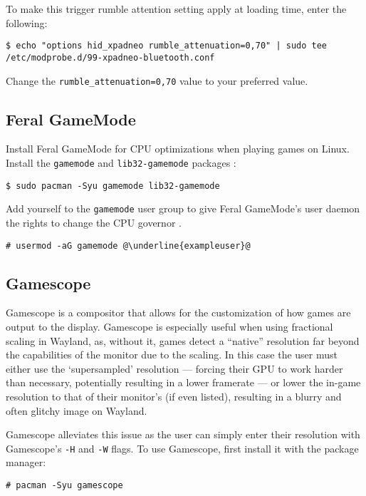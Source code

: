 \documentclass[a4paper]{article}
\begin{document}
To make this trigger rumble attention setting apply at loading time, enter the following: \cite{xpadneo-troubleshooting}

\begin{lstlisting}
$ echo "options hid_xpadneo rumble_attenuation=0,70" | sudo tee /etc/modprobe.d/99-xpadneo-bluetooth.conf
\end{lstlisting}
Change the \lstinline|rumble_attenuation=0,70| value to your preferred value.

\subsection{Feral GameMode}

Install Feral GameMode for CPU optimizations when playing games on Linux.
Install the \lstinline|gamemode| and \lstinline|lib32-gamemode| packages \cite{arch-wiki-gamemode}:

\begin{lstlisting}
$ sudo pacman -Syu gamemode lib32-gamemode
\end{lstlisting}

Add yourself to the \lstinline|gamemode| user group to give Feral GameMode's user daemon the rights to change the CPU governor \cite{arch-wiki-gamemode}.
\begin{lstlisting}[escapechar=@]
# usermod -aG gamemode @\underline{exampleuser}@
\end{lstlisting}

\subsection{Gamescope}

Gamescope is a compositor that allows for the customization of how games are output to the display.
Gamescope is especially useful when using fractional scaling in Wayland, as, without it, games detect a ``native'' resolution far beyond the capabilities of the monitor due to the scaling.
In this case the user must either use the `supersampled' resolution --- forcing their GPU to work harder than necessary, potentially resulting in a lower framerate --- or lower the in-game resolution to that of their monitor's (if even listed), resulting in a blurry and often glitchy image on Wayland.

Gamescope alleviates this issue as the user can simply enter their resolution with Gamescope's \lstinline|-H| and \lstinline|-W| flags.
To use Gamescope, first install it with the package manager:
\begin{lstlisting}
# pacman -Syu gamescope
\end{lstlisting}
\end{document}
